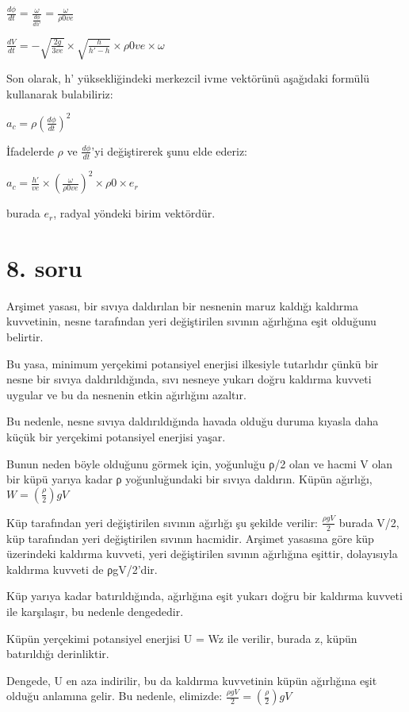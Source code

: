 \documentclass[12pt]{article}
\begin{document}
$\frac{d\phi}{dt}=\frac{\omega}{\frac{d\phi}{dh'}}=\frac{\omega}{\rho0ve}$

$\frac{dV}{dt}=-\sqrt{\frac{2g}{3ve}}\times\sqrt{\frac{h}{h'-h}}\times\rho0ve\times\omega$

Son olarak, h' yüksekliğindeki merkezcil ivme vektörünü aşağıdaki formülü kullanarak bulabiliriz:

$a_c=\rho(\frac{d\phi}{dt})^2$

İfadelerde $\rho$ ve $\frac{d\phi}{dt}$'yi değiştirerek şunu elde ederiz:

$a_c=\frac{h'}{ve}\times(\frac{\omega}{\rho0ve})^2\times\rho0\times e_r$

burada $e_r$, radyal yöndeki birim vektördür.






\newpage
\section{8. soru}
Arşimet yasası, bir sıvıya daldırılan bir nesnenin maruz kaldığı kaldırma kuvvetinin, nesne tarafından yeri değiştirilen sıvının ağırlığına eşit olduğunu belirtir.

Bu yasa, minimum yerçekimi potansiyel enerjisi ilkesiyle tutarlıdır çünkü bir nesne bir sıvıya daldırıldığında, sıvı nesneye yukarı doğru kaldırma kuvveti uygular ve bu da nesnenin etkin ağırlığını azaltır.

Bu nedenle, nesne sıvıya daldırıldığında havada olduğu duruma kıyasla daha küçük bir yerçekimi potansiyel enerjisi yaşar.

Bunun neden böyle olduğunu görmek için, yoğunluğu ρ/2 olan ve hacmi V olan bir küpü yarıya kadar ρ yoğunluğundaki bir sıvıya daldırın.
Küpün ağırlığı, $W=(\frac{\rho}{2})gV$

Küp tarafından yeri değiştirilen sıvının ağırlığı şu şekilde verilir:
$\frac{\rho gV}{2}$
\bigbreak
burada V/2, küp tarafından yeri değiştirilen sıvının hacmidir. Arşimet yasasına göre küp üzerindeki kaldırma kuvveti, yeri değiştirilen sıvının ağırlığına eşittir, dolayısıyla kaldırma kuvveti de ρgV/2'dir.

Küp yarıya kadar batırıldığında, ağırlığına eşit yukarı doğru bir kaldırma kuvveti ile karşılaşır, bu nedenle dengededir.

Küpün yerçekimi potansiyel enerjisi U = Wz ile verilir, burada z, küpün batırıldığı derinliktir.

Dengede, U en aza indirilir, bu da kaldırma kuvvetinin küpün ağırlığına eşit olduğu anlamına gelir. Bu nedenle, elimizde:
\bigbreak
$\frac{\rho gV}{2}=(\frac{\rho}{2})gV$
\end{document}
